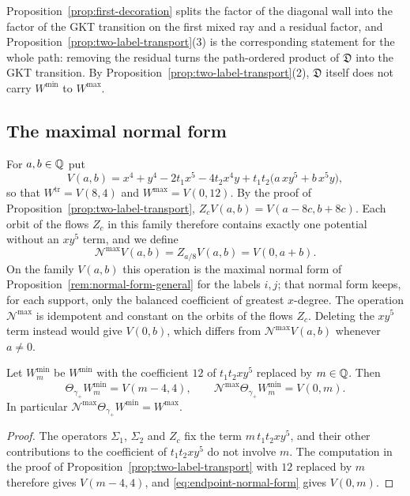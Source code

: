 \begin{remark}
\label{rem:residual-not-correction}
Proposition~\ref{prop:first-decoration} splits the factor of the diagonal
wall into the factor of the GKT transition on the first mixed ray and a
residual factor, and
Proposition~\ref{prop:two-label-transport}(3) is the corresponding statement
for the whole path: removing the residual turns the path-ordered product of
$\mathfrak D$ into the GKT transition.  By
Proposition~\ref{prop:two-label-transport}(2), $\mathfrak D$ itself does not
carry $W^{\min}$ to $W^{\max}$.
\end{remark}

\subsection{The maximal normal form}
\label{subsec:maximal-normal-form}

For $a,b\in\mathbb Q$ put
\[
 V(a,b)=x^4+y^4-2t_1x^5-4t_2x^4y+t_1t_2\bigl(a\,xy^5+b\,x^5y\bigr),
\]
so that $W^{\mathrm{tr}}=V(8,4)$ and $W^{\max}=V(0,12)$.  By the proof of
Proposition~\ref{prop:two-label-transport},
$Z_cV(a,b)=V(a-8c,b+8c)$.  Each orbit of the flows $Z_c$ in this family
therefore contains exactly one potential without an $xy^5$ term, and we
define
\begin{equation}\label{eq:endpoint-normal-form}
 \mathcal N^{\max}V(a,b)=Z_{a/8}V(a,b)=V(0,a+b).
\end{equation}
On the family $V(a,b)$ this operation is the maximal normal form of
Proposition~\ref{rem:normal-form-general} for the labels $i,j$; that normal
form keeps, for each support, only the balanced coefficient of greatest
$x$-degree.  The operation $\mathcal N^{\max}$ is idempotent and constant on
the orbits of the flows $Z_c$.
Deleting the $xy^5$ term instead would give $V(0,b)$, which differs from
$\mathcal N^{\max}V(a,b)$ whenever $a\neq0$.

\begin{proposition}
\label{prop:normal-form}
Let $W^{\min}_m$ be $W^{\min}$ with the coefficient $12$ of $t_1t_2xy^5$
replaced by $m\in\mathbb Q$.  Then
\[
 \Theta_{\gamma_+}W^{\min}_m=V(m-4,4),
 \qquad
 \mathcal N^{\max}\Theta_{\gamma_+}W^{\min}_m=V(0,m).
\]
In particular $\mathcal N^{\max}\Theta_{\gamma_+}W^{\min}=W^{\max}$.
\end{proposition}

\begin{proof}
The operators $\Sigma_1$, $\Sigma_2$ and $Z_c$ fix the term $m\,t_1t_2xy^5$, and their
other contributions to the coefficient of $t_1t_2xy^5$ do not involve $m$.
The computation in the proof of
Proposition~\ref{prop:two-label-transport} with $12$ replaced by $m$
therefore gives $V(m-4,4)$, and \eqref{eq:endpoint-normal-form} gives
$V(0,m)$.
\end{proof}

